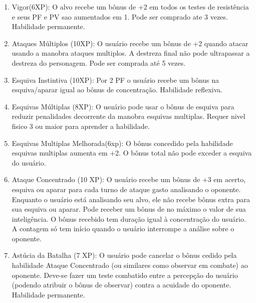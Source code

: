 \begin{enumerate}
	
	
	\item Vigor(6XP): O alvo recebe um bônus de +2 em todos os testes de resistência e seus PF e PV sao aumentados em 1. Pode ser comprado ate 3 vezes. Habilidade permanente.

	\item Ataques Múltiplos (10XP): O usuário recebe um bônus de +2 quando atacar usando a manobra ataques multiplos. A destreza final não pode ultrapassar a destreza do personagem. Pode ser comprada até 5 vezes.

	\item Esquiva Instintiva (10XP): Por 2 PF o usuário recebe um bônus na esquiva/aparar igual ao bônus de concentração. Habilidade reflexiva.
	
	\item Esquivas Múltiplas (8XP): O usuário pode usar o bônus de esquiva para reduzir penalidades decorrente da manobra esquivas multiplas. Requer nivel fisico 3 ou maior para aprender a habilidade.	

	\item Esquivas Multiplas Melhorada(6xp): O bônus concedido pela habilidade esquivas multiplas aumenta em +2. O bônus total não pode exceder a esquiva do usuário.

	\item Ataque Concentrado (10 XP): O usuário recebe um bônus de +3 em acerto, esquiva ou aparar para cada turno de ataque gasto analisando o oponente. Enquanto o usuário está analisando seu alvo, ele não recebe bônus extra para sua esquiva ou aparar. Pode receber um bônus de no máximo o valor de sua inteligência. O bônus recebido tem duração igual à concentração do usuário. A contagem só tem início quando o usuário interrompe a análise sobre o oponente.

	\item Astúcia da Batalha (7 XP): O usuário pode cancelar o bônus cedido pela habilidade Ataque Concentrado (ou similares como observar em combate) ao oponente. Deve-se fazer um teste combatido entre a percepção do usuário (podendo atribuir o bônus de observar) contra a acuidade do oponente. Habilidade permanente.
	

\end{enumerate}
